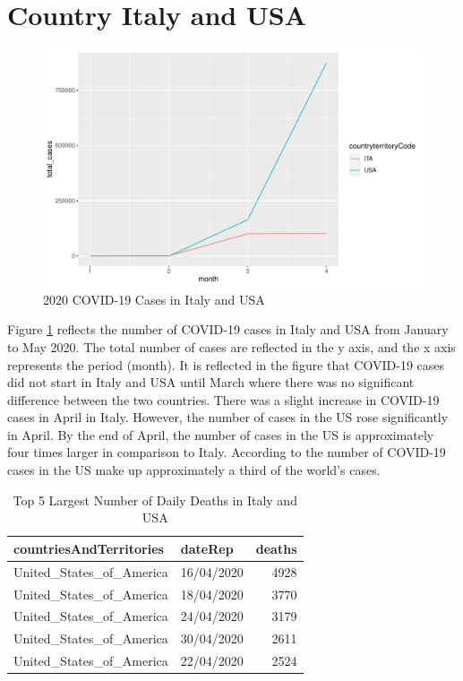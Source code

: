 \documentclass[11pt,a4paper,]{article}
\begin{document}
\section*{Country Italy and USA}

\begin{figure}
\centering
\includegraphics{report_files/figure-latex/cases-plot-1.pdf}
\caption{\label{fig:cases-plot}2020 COVID-19 Cases in Italy and USA}
\end{figure}

Figure \ref{fig:cases-plot} reflects the number of COVID-19 cases in Italy and USA from January to May 2020. The total number of cases are reflected in the y axis, and the x axis represents the period (month). It is reflected in the figure that COVID-19 cases did not start in Italy and USA until March where there was no significant difference between the two countries. There was a slight increase in COVID-19 cases in April in Italy. However, the number of cases in the US rose significantly in April. By the end of April, the number of cases in the US is approximately four times larger in comparison to Italy. According to \autocite{vox} the number of COVID-19 cases in the US make up approximately a third of the world's cases.

\clearpage

\begin{table}

\caption{\label{tab:death-table}Top 5 Largest Number of Daily Deaths in Italy and USA}
\centering
\begin{tabular}[t]{l|l|r}
\hline
countriesAndTerritories & dateRep & deaths\\
\hline
United\_States\_of\_America & 16/04/2020 & 4928\\
\hline
United\_States\_of\_America & 18/04/2020 & 3770\\
\hline
United\_States\_of\_America & 24/04/2020 & 3179\\
\hline
United\_States\_of\_America & 30/04/2020 & 2611\\
\hline
United\_States\_of\_America & 22/04/2020 & 2524\\
\hline
\end{tabular}
\end{table}
\end{document}
